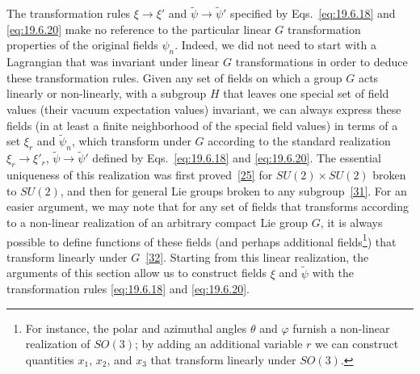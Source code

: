 The transformation rules $\xi\to\xi'$ and $\widetilde\psi\to\widetilde\psi'$ specified by Eqs.~\eqref{eq:19.6.18} and \eqref{eq:19.6.20} make no reference to the particular linear $G$ transformation properties of the original fields $\psi_n$. Indeed, we did not need to start with a Lagrangian that was invariant under linear $G$ transformations in order to deduce these transformation rules. Given any set of fields on which a group $G$ acts linearly or non-linearly, with a subgroup $H$ that leaves one special set of field values (their vacuum expectation values) invariant, we can always express these fields (in at least a finite neighborhood of the special field values) in terms of a set $\xi_r$ and $\widetilde\psi_n$, which transform under $G$ according to the standard realization $\xi_r\to\xi'_r$, $\widetilde\psi\to\widetilde\psi'$ defined by Eqs.~\eqref{eq:19.6.18} and \eqref{eq:19.6.20}. The essential uniqueness of this realization was first proved~\hyperref[ch19-ref-25]{[25]} for $SU(2)\times SU(2)$ broken to $SU(2)$, and then for general Lie groups broken to any subgroup~\hyperref[ch19-ref-31]{[31]}. For an easier argument, we may note that for any set of fields that transforms according to a non-linear realization of an arbitrary compact Lie group $G$, it is always possible to define functions of these fields (and perhaps additional fields\footnote{For instance, the polar and azimuthal angles $\theta$ and $\varphi$ furnish a non-linear realization of $SO(3)$; by adding an additional variable $r$ we can construct quantities $x_1$, $x_2$, and $x_3$ that transform linearly under $SO(3)$.}) that transform linearly under $G$~\hyperref[ch19-ref-32]{[32]}. Starting from this linear realization, the arguments of this section allow us to construct fields $\xi$ and $\widetilde\psi$ with the transformation rules \eqref{eq:19.6.18} and \eqref{eq:19.6.20}.

